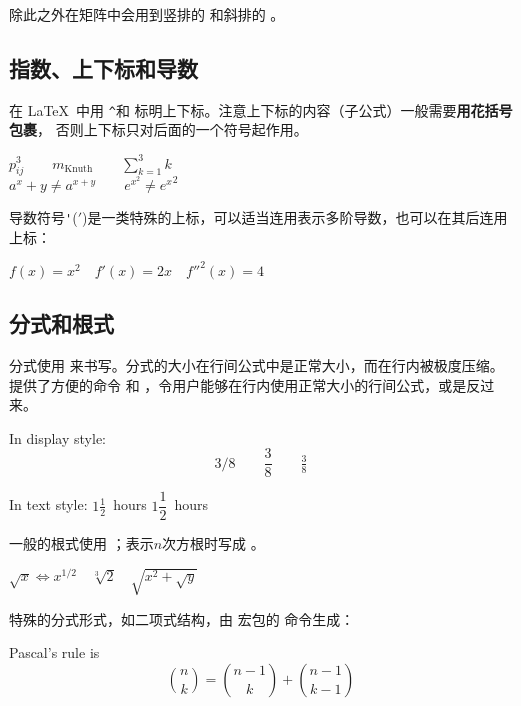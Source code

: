 除此之外在矩阵中会用到竖排的  和斜排的 。

\subsection{指数、上下标和导数}

在 \LaTeX\ 中用 \texttt\textasciicircum 和 \texttt\textunderscore 标明上下标。注意上下标的内容（子公式）一般需要\textbf{用花括号包裹}，
否则上下标只对后面的一个符号起作用。
\begin{example}
$p^3_{ij} \qquad
m_\text{Knuth}\qquad
\sum_{k=1}^3 k $\\[5pt]
$a^x+y \neq a^{x+y}\qquad
e^{x^2} \neq {e^x}^2$
\end{example}

导数符号\texttt'(${}'$)是一类特殊的上标，可以适当连用表示多阶导数，也可以在其后连用上标：
\begin{example}
$f(x) = x^2 \quad f'(x)
= 2x \quad f''^{2}(x) = 4$
\end{example}

\subsection{分式和根式}\label{subsec:frac-sqrt}

分式使用  来书写。分式的大小在行间公式中是正常大小，而在行内被极度压缩。
 提供了方便的命令  和 ，令用户能够在行内使用正常大小的行间公式，或是反过来。
\begin{example}
In display style:
\[
3/8 \qquad \frac{3}{8}
\qquad \tfrac{3}{8}
\]
\end{example}
\begin{example}
In text style:
$1\frac{1}{2}$~hours \qquad
$1\dfrac{1}{2}$~hours
\end{example}

一般的根式使用 ；表示$n$次方根时写成 。
\begin{example}
$\sqrt{x} \Leftrightarrow x^{1/2}
\quad \sqrt[3]{2}
\quad \sqrt{x^{2} + \sqrt{y}}$
\end{example}

特殊的分式形式，如二项式结构，由  宏包的  命令生成：
\begin{example}
Pascal’s rule is
\[
\binom{n}{k} =\binom{n-1}{k}
+ \binom{n-1}{k-1}
\]
\end{example}

